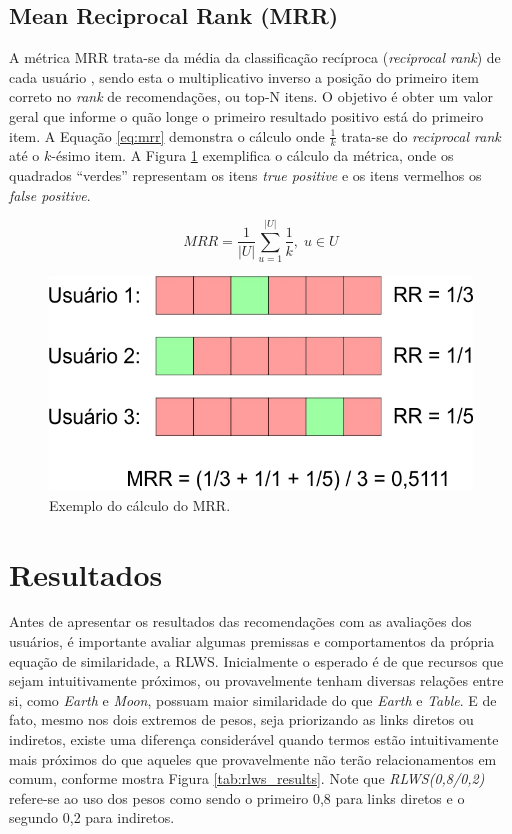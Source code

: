 \subsection{Mean Reciprocal Rank (MRR)}

A métrica \ac{MRR} trata-se da média da classificação recíproca (\textit{reciprocal rank}) de cada usuário \citep{Burges:2006}, sendo esta o multiplicativo inverso a posição do primeiro item correto no \textit{rank} de recomendações, ou top-N itens. O objetivo é obter um valor geral que informe o quão longe o primeiro resultado positivo está do primeiro item. A Equação \ref{eq:mrr} demonstra o cálculo onde $\frac{1}{k}$ trata-se do \textit{reciprocal rank} até o $k$-ésimo item. A Figura \ref{fig:mrr_ex} exemplifica o cálculo da métrica, onde os quadrados \enquote{verdes} representam os itens \textit{true positive} e os itens vermelhos os \textit{false positive}.

\begin{equation}
	MRR = \frac{1}{|U|} \sum_{u=1}^{|U|} \frac{1}{k}, \; u \in U
\label{eq:mrr}
\end{equation}

\begin{figure}
	\centering
	\includegraphics[scale=0.4]{imagens/mrr_ex.jpg}
	\caption{Exemplo do cálculo do MRR.}
	\label{fig:mrr_ex}
\end{figure}

\section{Resultados}
\label{sec:results}

Antes de apresentar os resultados das recomendações com as avaliações dos usuários, é importante avaliar algumas premissas e comportamentos da própria equação de similaridade, a \ac{RLWS}. Inicialmente o esperado é de que recursos que sejam intuitivamente próximos, ou provavelmente tenham diversas relações entre si,  como \textit{Earth} e \textit{Moon}, possuam maior similaridade do que \textit{Earth} e \textit{Table}. E de fato, mesmo nos dois extremos de pesos, seja priorizando as links diretos ou indiretos, existe uma diferença considerável quando termos estão intuitivamente mais próximos do que aqueles que provavelmente não terão relacionamentos em comum, conforme mostra Figura \ref{tab:rlws_results}. Note que \textit{RLWS(0,8/0,2)} refere-se ao uso dos pesos como sendo o primeiro 0,8 para links diretos e o segundo 0,2 para indiretos.


